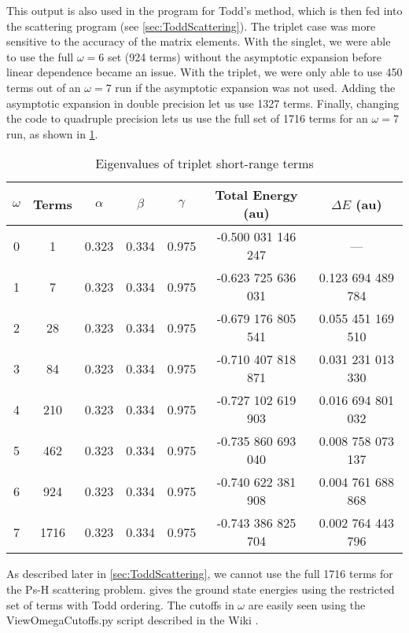 \documentclass[Dissertation.tex]{subfiles}
\begin{document}
This output is also used in the program for Todd's method, which is then fed 
into the scattering program (see \cref{sec:ToddScattering}). The triplet case 
was more sensitive to the accuracy of the matrix elements. With the singlet, 
we were able to use the full $\omega = 6$ set (924 terms) without the 
asymptotic expansion before linear dependence became an issue. With the 
triplet, we were only able to use 450 terms out of an $\omega = 7$ run if the 
asymptotic expansion was not used. Adding the asymptotic expansion in double 
precision let us use 1327 terms. Finally, changing the code to quadruple 
precision lets us use the full set of 1716 terms for an $\omega = 7$ run, as 
shown in \cref{tab:BoundEnergy3}. 

\setlength{\abovecaptionskip}{6pt}   %
\setlength{\belowcaptionskip}{6pt}   %
\begin{table}[H]
\centering
\begin{tabular}{c c c c c c c}
\toprule
$\omega$ & Terms & $\alpha$ & $\beta$ & $\gamma$ & Total Energy (au) & $\Delta E$ (au) \\ [0.5ex]
\midrule
0 & 1    & 0.323 & 0.334 & 0.975 & -0.500 031 146 247 & --- \\
1 & 7    & 0.323 & 0.334 & 0.975 & -0.623 725 636 031 & 0.123 694 489 784 \\
2 & 28   & 0.323 & 0.334 & 0.975 & -0.679 176 805 541 & 0.055 451 169 510 \\
3 & 84   & 0.323 & 0.334 & 0.975 & -0.710 407 818 871 & 0.031 231 013 330 \\
4 & 210  & 0.323 & 0.334 & 0.975 & -0.727 102 619 903 & 0.016 694 801 032 \\
5 & 462  & 0.323 & 0.334 & 0.975 & -0.735 860 693 040 & 0.008 758 073 137 \\
6 & 924  & 0.323 & 0.334 & 0.975 & -0.740 622 381 908 & 0.004 761 688 868 \\
7 & 1716 & 0.323 & 0.334 & 0.975 & -0.743 386 825 704 & 0.002 764 443 796 \\
\bottomrule
\end{tabular}
\caption{Eigenvalues of triplet short-range terms}
\label{tab:BoundEnergy3}
\end{table}

As described later in \cref{sec:ToddScattering}, we cannot use the full 1716 
terms for the Ps-H scattering problem.  gives the 
ground state energies using the restricted set of terms with Todd ordering. 
The cutoffs in $\omega$ are easily seen using the ViewOmegaCutoffs.py script 
described in the Wiki \cite{Wiki}.
\end{document}
